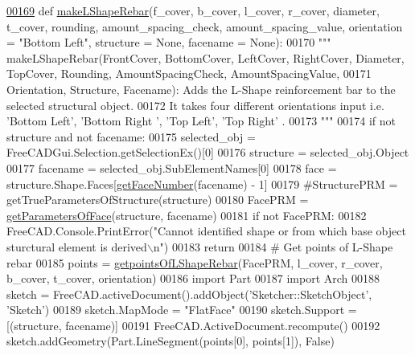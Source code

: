 \begin{DoxyCode}
\hypertarget{namespaceLShapeRebar.tex_l00169}{}\hyperlink{namespaceLShapeRebar_a647a28e94933108c6617da8532d76998}{00169} \textcolor{keyword}{def }\hyperlink{namespaceLShapeRebar_a647a28e94933108c6617da8532d76998}{makeLShapeRebar}(f\_cover, b\_cover, l\_cover, r\_cover, diameter, t\_cover, rounding, 
      amount\_spacing\_check, amount\_spacing\_value, orientation = "Bottom Left", structure = None, facename = None):
00170     \textcolor{stringliteral}{""" makeLShapeRebar(FrontCover, BottomCover, LeftCover, RightCover, Diameter, TopCover, Rounding,
       AmountSpacingCheck, AmountSpacingValue,}
00171 \textcolor{stringliteral}{    Orientation, Structure, Facename): Adds the L-Shape reinforcement bar to the selected structural
       object.}
00172 \textcolor{stringliteral}{    It takes four different orientations input i.e. 'Bottom Left', 'Bottom Right ', 'Top Left', 'Top Right'
      .}
00173 \textcolor{stringliteral}{    """}
00174     \textcolor{keywordflow}{if} \textcolor{keywordflow}{not} structure \textcolor{keywordflow}{and} \textcolor{keywordflow}{not} facename:
00175         selected\_obj = FreeCADGui.Selection.getSelectionEx()[0]
00176         structure = selected\_obj.Object
00177         facename = selected\_obj.SubElementNames[0]
00178     face = structure.Shape.Faces[\hyperlink{namespaceRebarfunc_a3885b3b63e3a41508ac79bc7550cf301}{getFaceNumber}(facename) - 1]
00179     \textcolor{comment}{#StructurePRM = getTrueParametersOfStructure(structure)}
00180     FacePRM = \hyperlink{namespaceRebarfunc_a92122b3d7cedd3d47bb63380a5ac4d08}{getParametersOfFace}(structure, facename)
00181     \textcolor{keywordflow}{if} \textcolor{keywordflow}{not} FacePRM:
00182         FreeCAD.Console.PrintError(\textcolor{stringliteral}{"Cannot identified shape or from which base object sturctural element is
       derived\(\backslash\)n"})
00183         \textcolor{keywordflow}{return}
00184     \textcolor{comment}{# Get points of L-Shape rebar}
00185     points = \hyperlink{namespaceLShapeRebar_a3019960c6f6476cb70df9ee06f330dfb}{getpointsOfLShapeRebar}(FacePRM, l\_cover, r\_cover, b\_cover, t\_cover, 
      orientation)
00186     \textcolor{keyword}{import} Part
00187     \textcolor{keyword}{import} Arch
00188     sketch = FreeCAD.activeDocument().addObject(\textcolor{stringliteral}{'Sketcher::SketchObject'}, \textcolor{stringliteral}{'Sketch'})
00189     sketch.MapMode = \textcolor{stringliteral}{"FlatFace"}
00190     sketch.Support = [(structure, facename)]
00191     FreeCAD.ActiveDocument.recompute()
00192     sketch.addGeometry(Part.LineSegment(points[0], points[1]), \textcolor{keyword}{False})

\end{DoxyCode}
